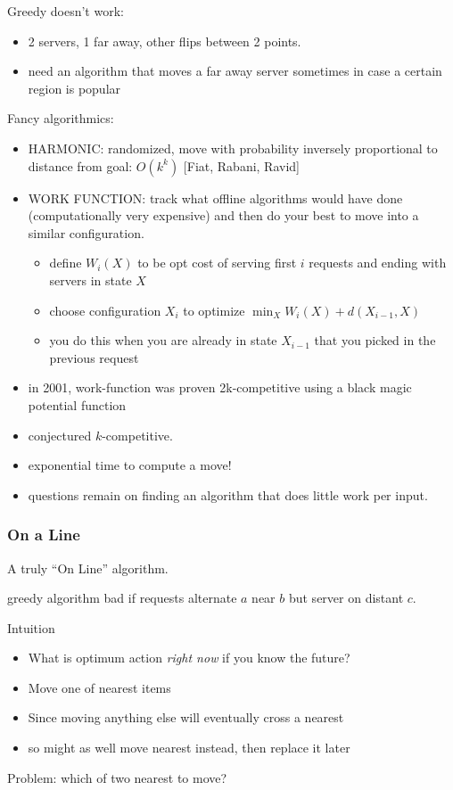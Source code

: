 \documentclass{article}
\begin{document}
Greedy doesn't work:
\begin{itemize}
\item 2 servers, 1 far away, other flips between 2 points.
\item need an algorithm that moves a far away server sometimes in case
  a certain region is popular
\end{itemize}

Fancy algorithmics:
\begin{itemize}
\item HARMONIC: randomized, move with probability inversely proportional
  to distance from goal: $O(k^k)$ [Fiat, Rabani,  Ravid]
\item WORK FUNCTION: track what offline algorithms would have done
  (computationally very expensive) and then do your best to move into
  a similar configuration.
\begin{itemize}
\item define $W_i(X)$ to be opt cost of serving first $i$ requests and
  ending with servers in state $X$
\item choose configuration $X_i$ to optimize $\min_X
  W_i(X)+d(X_{i-1},X)$
\item you do this when you are already in state $X_{i-1}$ that you
  picked in the previous request
\end{itemize}
\item in 2001, work-function was proven 2k-competitive using a black
  magic potential function
\item conjectured $k$-competitive.
\item exponential time to compute a move!
\item questions remain on finding an algorithm that does little work
  per input.
\end{itemize}


\subsubsection{On a Line}

A truly ``On Line'' algorithm.

greedy algorithm bad if requests alternate $a$ near $b$ but server on
distant $c$.

Intuition
\begin{itemize}
\item What is optimum action \emph{right now} if you know the future?
\item Move one of nearest items
\item Since moving anything else will eventually cross a nearest
\item so might as well move nearest instead, then replace it later
\end{itemize}
Problem: which of two nearest to move?
\end{document}
